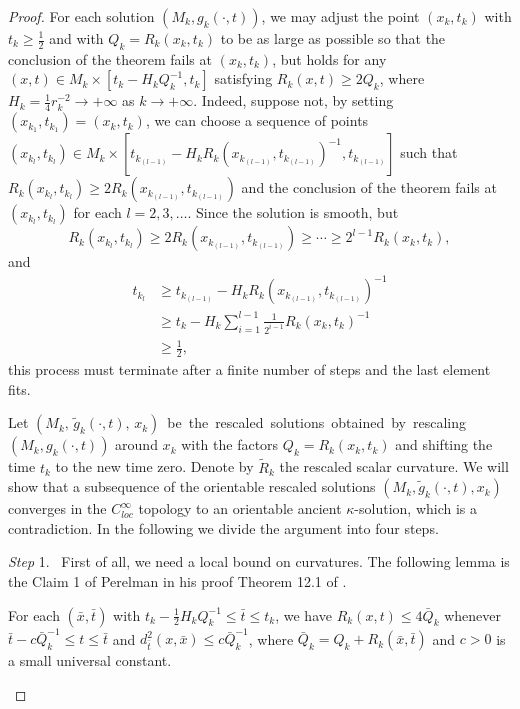 \begin{proof}
For each solution $(M_k,g_k(\cdot,t))$, we may adjust the point
$(x_k,t_k)$ with $t_k\geq \frac{1}{2}$ and with $Q_k=R_k(x_k,t_k)$
to be as large as possible so that the conclusion of the theorem
fails at $(x_k,t_k)$, but holds for any $(x,t)\in M_k\times
[t_k-H_kQ_k^{-1},t_k]$ satisfying $R_k(x,t)\geq 2Q_k$, where
$H_k=\frac{1}{4}r_k^{-2}\rightarrow +\infty$ as $k\rightarrow
+\infty.$  Indeed, suppose not, by setting
$(x_{k_1},t_{k_1})=(x_k,t_k)$, we can choose a sequence of points
$(x_{k_l},t_{k_l})\in M_k\times
[t_{k_{(l-1)}}-H_kR_k(x_{k_{(l-1)}},t_{k_{(l-1)}})^{-1},t_{k_{(l-1)}}]$
such that $R_k(x_{k_l},t_{k_l})\geq
2R_k(x_{k_{(l-1)}},t_{k_{(l-1)}})$ and the conclusion of the
theorem fails at $(x_{k_l},t_{k_l})$ for each $l =2, 3, \ldots.$
 Since the solution is smooth, but
$$
R_k(x_{k_l},t_{k_l})\geq 2R_k(x_{k_{(l-1)}},t_{k_{(l-1)}})\geq
\cdots \geq 2^{l-1}R_k(x_{k},t_{k}),
$$
and
\begin{align*}
t_{k_l}&  \geq
t_{k_{(l-1)}}-H_kR_k(x_{k_{(l-1)}},t_{k_{(l-1)}})^{-1}\\
&  \geq
t_{k}-H_k\sum\limits_{i=1}^{l-1}\frac{1}{2^{i-1}}R_k(x_{k},t_{k})^{-1}\\
&  \geq  \frac{1}{2},
\end{align*}
this process must terminate after a finite number of steps and the
last element fits.

Let\; $(M_k,\,\tilde{g}_k(\cdot,t),\,x_k)$\, be\, the\, rescaled\,
solutions\, obtained\, by\, rescaling $(M_k,g_k(\cdot,t))$ around
$x_k$ with the factors $Q_k=R_k(x_k,t_k)$ and shifting the time
$t_k$ to the new time zero. Denote by $\tilde{R}_k$ the rescaled
scalar curvature.  We will show that a subsequence of the
orientable rescaled solutions $(M_k,\tilde{g}_k(\cdot,t),x_k)$
converges in the $C^{\infty}_{loc}$ topology to an orientable
ancient $\kappa$-solution, which is a contradiction. In the
following we divide the argument into four steps.

\medskip
{\it Step} 1. \ First of all, we need a local bound on curvatures.
The following lemma is the Claim 1 of Perelman in his proof Theorem
12.1 of \cite{P1}.

\begin{lemma}
  \label{lem:cz-blowup-backward-parabolic-curvature-control}

For each $(\bar{x},\bar{t})$ with $t_k-\frac{1}{2}H_kQ_k^{-1}\leq
\bar{t}\leq t_k$, we have $R_k(x,t)\leq 4\bar{Q}_k$ whenever
$\bar{t}-c\bar{Q}_k^{-1}\leq t\leq \bar{t}$ and
$d^2_{\bar{t}}(x,\bar{x})\leq c\bar{Q}_k^{-1}$, where
$\bar{Q}_k=Q_k+R_k(\bar{x},\bar{t})$ and $c>0$ is a small
universal constant.
\end{lemma}


\end{proof}

